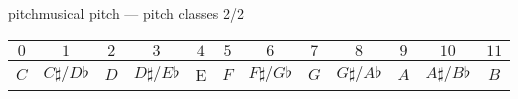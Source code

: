         \begin{frame}{pitch}{musical pitch --- pitch classes 2/2}
            \begin{footnotesize}
                \begin{table}
                    \centering
                    \begin{tabular}{cccccccccccc} %
                        \\ \hline
                        \bf{\emph{$0$}}	 & \bf{\emph{$1$}}	 & \bf{\emph{$2$}}	 & \bf{\emph{$3$}}	 & \bf{\emph{$4$}}	 & \bf{\emph{$5$}}	 & \bf{\emph{$6$}}	 & \bf{\emph{$7$}}	 & \bf{\emph{$8$}}	 & \bf{\emph{$9$}}	 & \bf{\emph{$10$}}	 & \bf{\emph{$11$}}\\ 
                         \hline
                        \bf{$C$}	 & $C\sharp / D\flat$	 & $D$	 & $D\sharp / E\flat$	 & E	 & $F$	 & $F\sharp / G\flat$	 & $G$	 & $G\sharp / A\flat$	 & $A$	 & $A\sharp / B\flat$	 & $B$\\
                    \end{tabular}
                \end{table}
            \end{footnotesize}

        \end{frame}
        
